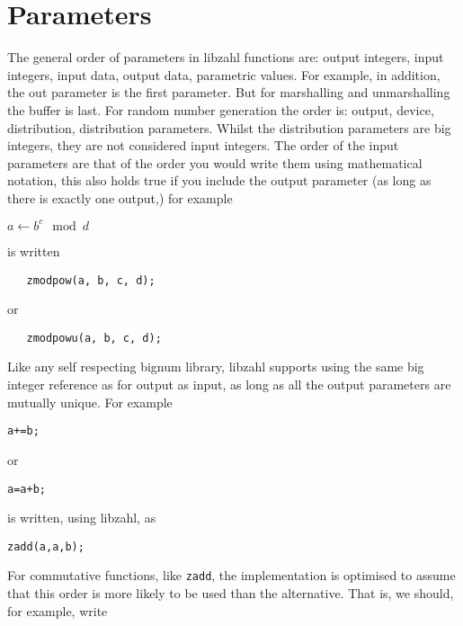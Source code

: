 \newpage
\section{Parameters}
\label{sec:Parameters}

The general order of parameters in libzahl functions
are: output integers, input integers, input data,
output data, parametric values. For example, in
addition, the out parameter is the first parameter.
But for marshalling and unmarshalling the buffer
is last. For random number generation the order is:
output, device, distribution, distribution parameters.
Whilst the distribution parameters are big integers,
they are not considered input integers. The order
of the input parameters are that of the order you
would write them using mathematical notation, this
also holds true if you include the output parameter
(as long as there is exactly one output,) for example

\vspace{1em}
$a \gets b^c \mod d$
\vspace{1em}

\noindent
is written

\begin{verbatim}
   zmodpow(a, b, c, d);
\end{verbatim}

\noindent
or

\begin{verbatim}
   zmodpowu(a, b, c, d);
\end{verbatim}

Like any self respecting bignum library, libzahl
supports using the same big integer reference as
for output as input, as long as all the output
parameters are mutually unique. For example

\begin{alltt}
   a += b;
\end{alltt}

\noindent
or

\begin{alltt}
   a = a + b;
\end{alltt}

\noindent
is written, using libzahl, as

\begin{alltt}
   zadd(a, a, b);
\end{alltt}

For commutative functions, like {\tt zadd}, the
implementation is optimised to assume that this
order is more likely to be used than the alternative.
That is, we should, for example, write

